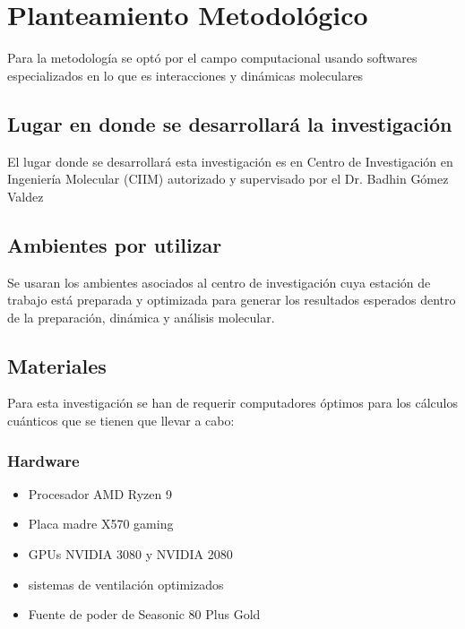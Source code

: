 \chapter{Planteamiento Metodológico}

Para la metodología se optó por el campo computacional usando softwares especializados en lo que es interacciones y dinámicas moleculares

\section{Lugar en donde se desarrollará la investigación}
El lugar donde se desarrollará esta investigación es en Centro de Investigación en Ingeniería Molecular (CIIM) autorizado y supervisado por el Dr. Badhin Gómez Valdez   

\section{Ambientes por utilizar}
Se usaran los ambientes asociados al centro de investigación cuya estación de trabajo está preparada y optimizada para generar los resultados esperados dentro de la preparación, dinámica y análisis molecular. 

\section{Materiales}
Para esta investigación se han de requerir computadores óptimos para los cálculos cuánticos que se tienen que llevar a cabo:

\subsection{Hardware}
\begin{itemize}
    \item Procesador AMD Ryzen 9 
    \item Placa madre X570 gaming
    \item GPUs NVIDIA 3080 y NVIDIA 2080
    \item sistemas de ventilación optimizados
    \item Fuente de poder de Seasonic 80 Plus Gold
\end{itemize}


